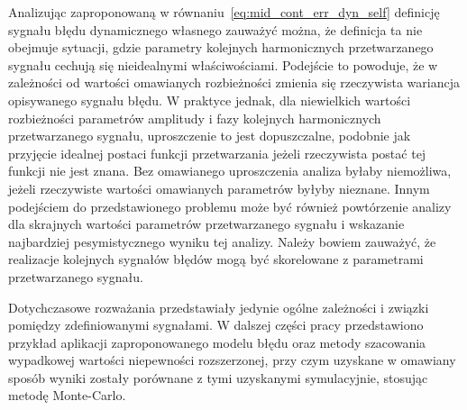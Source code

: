 Analizując zaproponowaną w równaniu~\eqref{eq:mid_cont_err_dyn_self} definicję sygnału błędu dynamicznego własnego zauważyć można, że definicja ta nie obejmuje sytuacji, gdzie parametry kolejnych harmonicznych przetwarzanego sygnału cechują się nieidealnymi właściwościami. Podejście to powoduje, że w zależności od wartości omawianych rozbieżności zmienia się rzeczywista wariancja opisywanego sygnału błędu. W praktyce jednak, dla niewielkich wartości rozbieżności parametrów amplitudy i fazy kolejnych harmonicznych przetwarzanego sygnału, uproszczenie to jest dopuszczalne, podobnie jak przyjęcie idealnej postaci funkcji przetwarzania jeżeli rzeczywista postać tej funkcji nie jest znana. Bez omawianego uproszczenia analiza byłaby niemożliwa, jeżeli rzeczywiste wartości omawianych parametrów byłyby nieznane. Innym podejściem do przedstawionego problemu może być również powtórzenie analizy dla skrajnych wartości parametrów przetwarzanego sygnału i wskazanie najbardziej pesymistycznego wyniku tej analizy. Należy bowiem zauważyć, że realizacje kolejnych sygnałów błędów mogą być skorelowane z parametrami przetwarzanego sygnału.

Dotychczasowe rozważania przedstawiały jedynie ogólne zależności i związki pomiędzy zdefiniowanymi sygnałami. W dalszej części pracy przedstawiono przykład aplikacji zaproponowanego modelu błędu oraz metody szacowania wypadkowej wartości niepewności rozszerzonej, przy czym uzyskane w omawiany sposób wyniki zostały porównane z tymi uzyskanymi symulacyjnie, stosując metodę Monte-Carlo.
